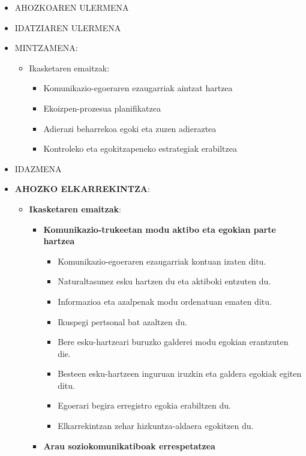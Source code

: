 \documentclass[
]{book}
\providecommand{\tightlist}{%
  \setlength{\itemsep}{0pt}\setlength{\parskip}{0pt}}
\begin{document}
\begin{itemize}
\item
  AHOZKOAREN ULERMENA
\item
  IDATZIAREN ULERMENA
\item
  MINTZAMENA:

  \begin{itemize}
  \tightlist
  \item
    Ikasketaren emaitzak:

    \begin{itemize}
    \tightlist
    \item
      Komunikazio-egoeraren ezaugarriak aintzat hartzea
    \item
      Ekoizpen-prozesua planifikatzea
    \item
      Adierazi beharrekoa egoki eta zuzen adieraztea
    \item
      Kontroleko eta egokitzapeneko estrategiak erabiltzea
    \end{itemize}
  \end{itemize}
\item
  IDAZMENA
\item
  \textbf{AHOZKO ELKARREKINTZA}:

  \begin{itemize}
  \tightlist
  \item
    \textbf{Ikasketaren emaitzak}:

    \begin{itemize}
    \tightlist
    \item
      \textbf{Komunikazio-trukeetan modu aktibo eta egokian parte hartzea}

      \begin{itemize}
      \tightlist
      \item
        Komunikazio-egoeraren ezaugarriak kontuan izaten ditu.
      \item
        Naturaltasunez esku hartzen du eta aktiboki entzuten du.
      \item
        Informazioa eta azalpenak modu ordenatuan ematen ditu.
      \item
        Ikuspegi pertsonal bat azaltzen du.
      \item
        Bere esku-hartzeari buruzko galderei modu egokian erantzuten die.
      \item
        Besteen esku-hartzeen inguruan iruzkin eta galdera egokiak egiten ditu.
      \item
        Egoerari begira erregistro egokia erabiltzen du.
      \item
        Elkarrekintzan zehar hizkuntza-aldaera egokitzen du.
      \end{itemize}
    \item
      \textbf{Arau soziokomunikatiboak errespetatzea}


\end{itemize}
\end{itemize}
\end{itemize}
\end{document}

